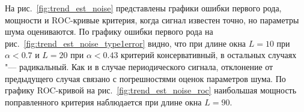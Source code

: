 \documentclass[specialist,
substylefile = spbu_report.rtx,
subf,href,colorlinks=true, 12pt]{disser}
\theoremstyle{definition}
\begin{document}
На рис.~\ref{fig:trend_est_noise} представлены графики ошибки первого рода, мощности и ROC-кривые критерия, когда сигнал известен точно, но параметры шума оцениваются. По графику ошибки первого рода на рис.~\ref{fig:trend_est_noise_type1error} видно, что при длине окна $L=10$ при $\alpha<0.7$ и $L=20$ при $\alpha<0.43$ критерий консервативный, в остальных случаях "--- радикальный. Как и в случае периодического сигнала, отклонение от предыдущего случая связано с погрешностями оценок параметров шума. По графику ROC-кривой на рис.~\ref{fig:trend_est_noise_roc} наибольшая мощность поправленного критерия наблюдается при длине окна $L=90$.
\conclusion
%


\end{document}
